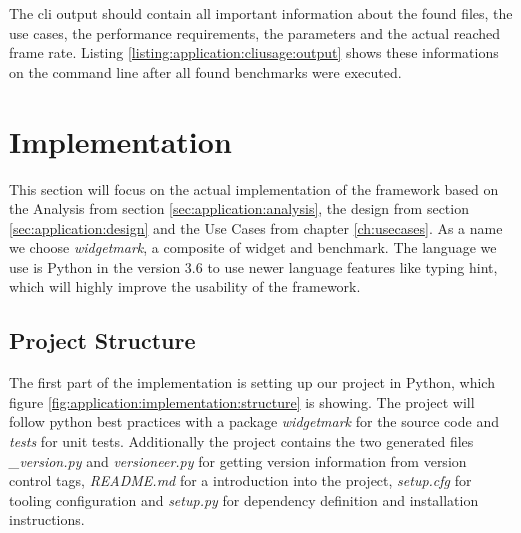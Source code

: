 

The \gls{cli} output should contain all important information about the found files,
the use cases, the performance requirements, the parameters and the actual
reached frame rate. Listing \ref{listing:application:cliusage:output} shows these
informations on the command line after all found benchmarks were executed.







\section{Implementation} \label{sec:application:implementation}

This section will focus on the actual implementation of the framework based on
the Analysis from section \ref{sec:application:analysis}, the design from
section \ref{sec:application:design} and the Use Cases from chapter
\ref{ch:usecases}. As a name we choose \emph{widgetmark}, a composite of widget
and benchmark.  The language we use is Python in the version 3.6 to use newer
language features like typing hint, which will highly improve the usability of
the framework.

\subsection{Project Structure}

The first part of the implementation is setting up our project in Python, which
figure \ref{fig:application:implementation:structure} is showing. The project
will follow python best practices with a package \emph{widgetmark} for the
source code and \emph{tests} for unit tests. Additionally the project contains
the two generated files \emph{\_version.py} and \emph{versioneer.py} for getting
version information from version control tags, \emph{README.md} for a
introduction into the project, \emph{setup.cfg} for tooling configuration and
\emph{setup.py} for dependency definition and installation instructions.

